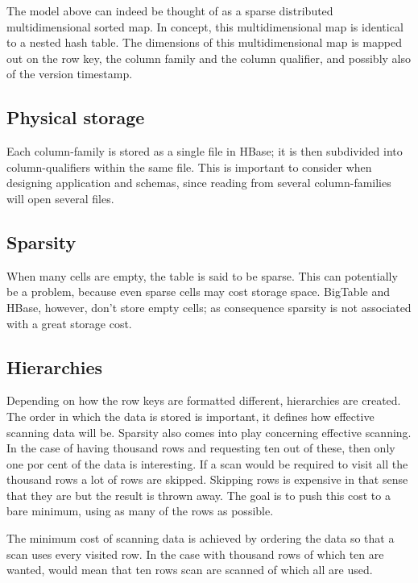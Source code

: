 \vspace{-12pt}

The model above can indeed be thought of as a sparse distributed
multidimensional sorted map. In concept, this multidimensional map is identical
to a nested hash table. The dimensions of this multidimensional map is mapped
out on the row key, the column family and the column qualifier, and possibly
also of the version timestamp.

\subsection*{Physical storage}

Each column-family is stored as a single file in HBase; it is then subdivided
into column-qualifiers within the same file. This is important to consider when
designing application and schemas, since reading from several column-families
will open several files.


\subsection*{Sparsity}

When many cells are empty, the table is said to be sparse. This can potentially
be a problem, because even sparse cells may cost storage space.  BigTable and
HBase, however, don't store empty cells; as consequence sparsity is not
associated with a great storage cost.
\cite{olap_data_scalability,olap_solutions}


\subsection*{Hierarchies}

Depending on how the row keys are formatted different, hierarchies are created.
The order in which the data is stored is important, it defines how effective
scanning data will be. Sparsity also comes into play concerning effective
scanning. In the case of having thousand rows and requesting ten out of these,
then only one por cent of the data is interesting. If a scan would be required
to visit all the thousand rows a lot of rows are skipped. Skipping rows is
expensive in that sense that they are but the result is thrown away. The goal is
to push this cost to a bare minimum, using as many of the rows as possible.

The minimum cost of scanning data is achieved by ordering the data so that
a scan uses every visited row. In the case with thousand rows of which ten
are wanted, would mean that ten rows scan are scanned of which all are
used.


